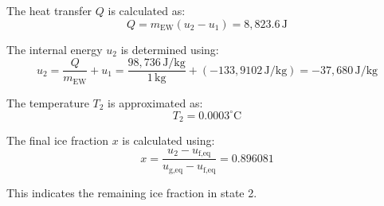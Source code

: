 The heat transfer \( Q \) is calculated as:  
\[
Q = m_{\text{EW}} (u_2 - u_1) = 8,823.6 \, \text{J}
\]  

The internal energy \( u_2 \) is determined using:  
\[
u_2 = \frac{Q}{m_{\text{EW}}} + u_1 = \frac{98,736 \, \text{J/kg}}{1 \, \text{kg}} + (-133,9102 \, \text{J/kg}) = -37,680 \, \text{J/kg}
\]  

The temperature \( T_2 \) is approximated as:  
\[
T_2 = 0.0003^\circ\text{C}
\]  

The final ice fraction \( x \) is calculated using:  
\[
x = \frac{u_2 - u_{\text{f,eq}}}{u_{\text{g,eq}} - u_{\text{f,eq}}} = 0.896081
\]  

This indicates the remaining ice fraction in state 2.
